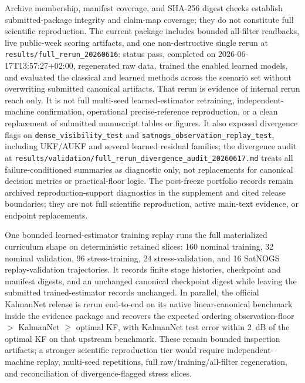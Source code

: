 \documentclass{article}
\begin{document}
Archive membership, manifest coverage, and SHA-256 digest checks establish submitted-package integrity and claim-map coverage; they do not constitute full scientific reproduction. The current package includes bounded all-filter readbacks, live public-week scoring artifacts, and one non-destructive single rerun at \nolinkurl{results/full_rerun_20260616}: status pass, completed on 2026-06-17T13:57:27+02:00, regenerated raw data, trained the enabled learned models, and evaluated the classical and learned methods across the scenario set without overwriting submitted canonical artifacts. That rerun is evidence of internal rerun reach only. It is not full multi-seed learned-estimator retraining, independent-machine confirmation, operational precise-reference reproduction, or a clean replacement of submitted manuscript tables or figures. It also exposed divergence flags on \texttt{dense\_visibility\_test} and \texttt{satnogs\_observation\_replay\_test}, including UKF/AUKF and several learned residual families; the divergence audit at \nolinkurl{results/validation/full_rerun_divergence_audit_20260617.md} treats all failure-conditioned summaries as diagnostic only, not replacements for canonical decision metrics or practical-floor logic. The post-freeze portfolio records remain archived reproduction-support diagnostics in the supplement and cited release boundaries; they are not full scientific reproduction, active main-text evidence, or endpoint replacements.

One bounded learned-estimator training replay runs the full materialized curriculum shape on deterministic retained slices: 160 nominal training, 32 nominal validation, 96 stress-training, 24 stress-validation, and 16 SatNOGS replay-validation trajectories. It records finite stage histories, checkpoint and manifest digests, and an unchanged canonical checkpoint digest while leaving the submitted trained-estimator records unchanged. In parallel, the official KalmanNet release is rerun end-to-end on its native linear-canonical benchmark inside the evidence package and recovers the expected ordering observation-floor $>$ KalmanNet $\geq$ optimal KF, with KalmanNet test error within 2~dB of the optimal KF on that upstream benchmark. These remain bounded inspection artifacts; a stronger scientific reproduction tier would require independent-machine replay, multi-seed repetitions, full raw/training/all-filter regeneration, and reconciliation of divergence-flagged stress slices.
\end{document}
